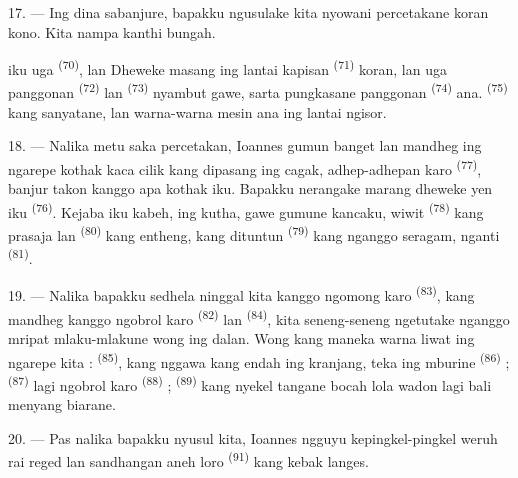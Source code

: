 17. --- Ing dina sabanjure, bapakku ngusulake kita nyowani percetakane
koran kono. Kita nampa kanthi bungah.

 iku uga  \textsuperscript{(70)},
  lan 
Dheweke masang ing lantai kapisan 
\textsuperscript{(71)} koran, lan uga  panggonan
 \textsuperscript{(72)} lan  \textsuperscript{(73)} nyambut gawe, sarta pungkasane
 panggonan 
\textsuperscript{(74)} ana.  \textsuperscript{(75)} kang
sanyatane,  lan warna-warna mesin ana ing lantai
ngisor.

\VUsaut{3.0mm}

18. --- Nalika metu saka percetakan, Ioannes gumun banget lan mandheg
ing ngarepe kothak kaca cilik kang dipasang ing cagak, adhep-adhepan
karo  \textsuperscript{(77)}, banjur takon
kanggo apa kothak iku. Bapakku nerangake marang dheweke yen iku
 \textsuperscript{(76)}. Kejaba iku kabeh, ing
kutha, gawe gumune kancaku, wiwit 
\textsuperscript{(78)} kang prasaja lan  \textsuperscript{(80)} kang entheng, kang dituntun
 \textsuperscript{(79)} kang nganggo seragam, nganti
 \textsuperscript{(81)}.

19. --- Nalika bapakku sedhela ninggal kita kanggo ngomong karo
 \textsuperscript{(83)}, kang mandheg kanggo
ngobrol karo  \textsuperscript{(82)} lan 
\textsuperscript{(84)}, kita seneng-seneng ngetutake nganggo mripat
mlaku-mlakune wong ing dalan. Wong kang maneka warna liwat ing ngarepe
kita :  \textsuperscript{(85)}, kang
nggawa  kang endah ing kranjang, teka ing mburine
 \textsuperscript{(86)} ;  \textsuperscript{(87)} lagi ngobrol karo 
\textsuperscript{(88)} ;  \textsuperscript{(89)} kang nyekel
tangane bocah lola wadon lagi bali menyang biarane.

\VUsaut{3.0mm}

20. --- Pas nalika bapakku nyusul kita, Ioannes ngguyu kepingkel-pingkel
weruh rai reged lan sandhangan aneh loro 
\textsuperscript{(91)} kang kebak langes.

